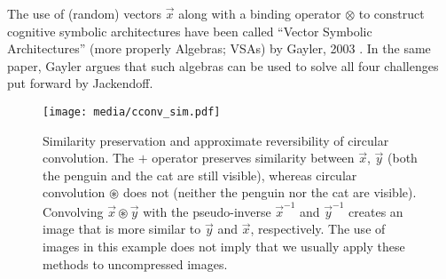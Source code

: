 \documentclass[10pt,letterpaper,oneside]{article}
\begin{document}
The use of (random) vectors $\vec x$ along with a binding operator $\otimes$ to construct cognitive symbolic architectures have been called \enquote{Vector Symbolic Architectures} (more properly Algebras; VSAs) by Gayler, 2003 \cite{gayler2003vector}. In the same paper, Gayler argues that such algebras can be used to solve all four challenges put forward by Jackendoff.

\begin{figure}
	\centering
	\texttt{[image: media/cconv\_sim.pdf]}
	\caption{Similarity preservation and approximate reversibility of circular convolution. The $+$ operator preserves similarity between $\vec x$, $\vec y$ (both the penguin and the cat are still visible), whereas circular convolution $\circledast$ does not (neither the penguin nor the cat are visible). Convolving $\vec x \circledast \vec y$ with the pseudo-inverse $\vec x^{-1}$ and $\vec y^{-1}$ creates an image that is more similar to $\vec y$ and $\vec x$, respectively. The use of images in this example does not imply that we usually apply these methods to uncompressed images. }
	\label{fig:cconv_sim}
\end{figure}
\end{document}
